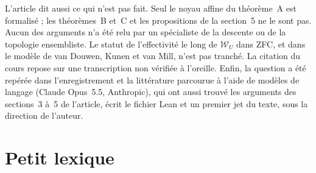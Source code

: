 \documentclass[11pt,a4paper]{amsart}
\theoremstyle{definition}
\theoremstyle{plain}
\theoremstyle{remark}
\begin{document}
L'article dit aussi ce qui n'est pas fait. Seul le noyau affine du théorème~A est formalisé ; les théorèmes~B et~C et les propositions de la section~5 ne le sont pas. Aucun des arguments n'a été relu par un spécialiste de la descente ou de la topologie ensembliste. Le statut de l'effectivité le long de $\mathcal W_U$ dans ZFC, et dans le modèle de van Douwen, Kunen et van Mill, n'est pas tranché. La citation du cours repose sur une transcription non vérifiée à l'oreille. Enfin, la question a été repérée dans l'enregistrement et la littérature parcourue à l'aide de modèles de langage (Claude Opus~5.5, Anthropic), qui ont aussi trouvé les arguments des sections~3 à~5 de l'article, écrit le fichier Lean et un premier jet du texte, sous la direction de l'auteur.

\section{Petit lexique}
\end{document}

